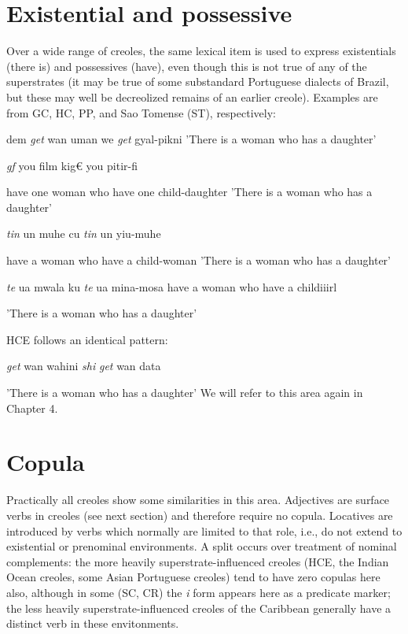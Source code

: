 \section{Existential and possessive}

Over a wide range of creoles, the same lexical item is used to express existentials ({\textquotedbl}there is{\textquotedbl}) and possessives ({\textquotedbl}have{\textquotedbl}), even though this is not true of any of the superstrates (it may be true of some substandard Portuguese dialects of Brazil, but these may well be de\-creolized remains of an earlier creole). Examples are from GC, HC, PP, and Sao Tomense (ST), respectively:

\ea\label{ex:55}
 dem \textit{get} wan uman we \textit{get }gyal-pikni 'There is a woman who has a daughter'
\glt
\z

\ea\label{ex:56}
\textit{gf} you film kig€ you pitir-fi
\glt
\z

have one woman who have one child-daughter 'There is a woman who has a daughter'

\ea\label{ex:57}
 \textit{tin} un muhe cu \textit{tin} un yiu-muhe
\glt
\z

have a woman who have a child-woman 'There is a woman who has a daughter'

\ea\label{ex:58}
 \textit{te} ua mwala ku \textit{te} ua mina-mosa have a woman who have a childiiirl
\glt
\z

'There is a woman who has a daughter'


HCE follows an identical pattern:

\ea\label{ex:59}
 \textit{get} wan wahini \textit{shi} \textit{get} wan data
\glt
\z

'There is a woman who has a daughter' We will refer to this area again in Chapter 4.

\section{Copula}


Practically all creoles show some similarities in this area. Adjec\-tives are surface verbs in creoles (see next section) and therefore require no copula. Locatives are introduced by verbs which normally are limited to that role, i.e., do not extend to existential or prenominal environments. A split occurs over treatment of nominal complements: the more heavily superstrate-influenced creoles (HCE, the Indian Ocean creoles, some Asian Portuguese creoles) tend to have zero copulas here also, although in some (SC, CR) the \textit{i} form appears here as a predicate marker; the less heavily superstrate-influenced creoles of the Caribbean generally have a distinct verb in these envitonments.

